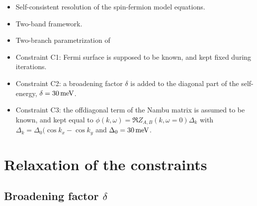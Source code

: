 \begin{itemize}
\item Self-consistent resolution of the spin-fermion model equations.
\item Two-band framework.
\item Two-branch parametrization of \chiqw
\item Constraint C1: Fermi surface is supposed to be known, and kept fixed
  during iterations.
\item Constraint C2: a broadening factor $\delta$ is added to the diagonal
  part of the self-energy, $\delta=\text{\SI{30}{\milli\electronvolt}}$.
\item Constraint C3: the offdiagonal term of the Nambu matrix is assumed
  to be known, and kept equal to $\phi(k,\omega) = \Re{Z_{A, B}}(k,
  \omega=0)\Delta_k$ with $\Delta_k = \Delta_0(\cos k_x- \cos k_y$
  and $\Delta_0=\text{\SI{30}{\milli\electronvolt}}$.
\end{itemize}

\section{Relaxation of the constraints}

\subsection{Broadening factor $\delta$}

